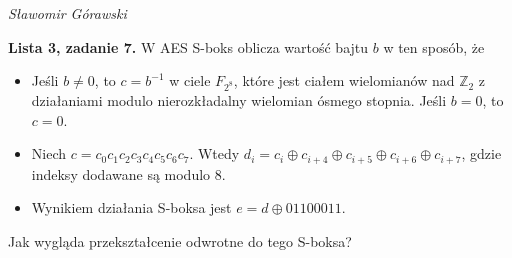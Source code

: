 \documentclass{article}
\newcommand{\xor}{\oplus}
\begin{document}
\begin{flushright}
\textit{Sławomir Górawski}
\end{flushright}
\bigskip

\noindent\textbf{Lista 3, zadanie 7.}
W AES S-boks oblicza wartość bajtu $b$ w ten sposób, że
\begin{itemize}
    \item Jeśli $b \ne 0$, to $c = b^{-1}$ w ciele $F_{2^8}$,
        które jest ciałem wielomianów nad $\mathbb{Z}_2$ z działaniami modulo
        nierozkładalny wielomian ósmego stopnia. Jeśli $b = 0$, to $c = 0$.
    \item Niech $c = c_0c_1c_2c_3c_4c_5c_6c_7$.
        Wtedy $d_i = c_i \xor c_{i + 4} \xor c_{i + 5} \xor c_{i + 6} \xor c_{i + 7}$,
        gdzie indeksy dodawane są modulo 8.
    \item Wynikiem działania S-boksa jest $e = d \xor 01100011$.
\end{itemize}
Jak wygląda przekształcenie odwrotne do tego S-boksa?
\end{document}
